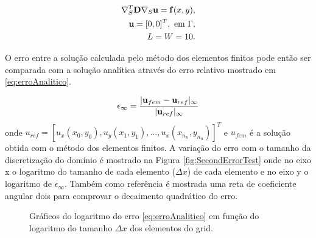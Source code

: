 \begin{equation}\label{eq:irinaproblem}
    \begin{aligned}
        \nabla_S^T \mathbf{D} \nabla_S  \mathbf{u} = \mathbf{f}(x, y), \\
        \mathbf{u} = [0, 0]^T, \text{ em } \Gamma ,\\
        L = W = 10.
    \end{aligned}
\end{equation}

O erro entre a solução calculada pelo método dos elementos finitos pode então ser comparada
com a solução analítica através do erro relativo mostrado em \eqref{eq:erroAnalitico}.

\begin{equation} \label{eq:erroAnalitico}
    \epsilon_{\infty} =\frac{|\mathbf{u}_{fem} - \mathbf{u}_{ref}|_{\infty}}{|\mathbf{u}_{ref}|_{\infty}}
\end{equation}
onde $u_{ref} = [u_x(x_0, y_0), u_y(x_1, y_1), ..., u_x(x_{n_n}, y_{n_n})]^T$ e $u_{fem}$ é a solução obtida com o método dos elementos finitos. A variação do erro com o tamanho da discretização do domínio é mostrado na Figura  \ref{fig:SecondErrorTest} onde no eixo x o logaritmo do tamanho de cada elemento ($\Delta x$) de cada elemento e no eixo y o logaritmo de $\epsilon_{\infty}$. Também como referência é mostrada uma reta de coeficiente angular dois para comprovar o decaimento quadrático do erro.


\begin{figure}[h]
\center
{}
\qquad
{}
\caption{Gráficos do logaritmo do erro \eqref{eq:erroAnalitico} em função do logaritmo do tamanho $\Delta x$ dos elementos do grid.}
\end{figure}
    
